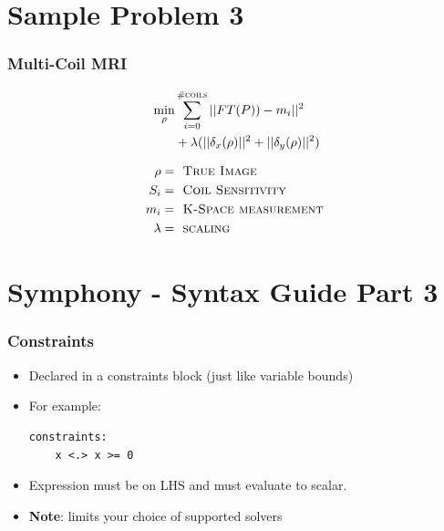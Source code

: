 \documentclass[presentation]{beamer}
\begin{document}
\section{Sample Problem 3}
\begin{frame}
  \frametitle{Multi-Coil MRI}

  \begin{align*}
    \min \limits_{\rho} &\sum \limits_{i=0}^{\textsc{\#coils}} || FT(P))-m_i||^2 \\
                             &+ \lambda (||\delta_x (\rho) ||^2 + || \delta_y(\rho) ||^2) \\
  \end{align*}
  
  \begin{align*}
    \rho &= \textsc{ True Image} \\
    S_i &= \textsc{ Coil Sensitivity} \\
    m_i &= \textsc{ K-Space measurement } \\
    \lambda &= \textsc{ scaling }
  \end{align*}

\end{frame}
\section{Symphony - Syntax Guide Part 3}

\begin{frame}[fragile]
  \frametitle{Constraints}

  \begin{itemize}
  \item Declared in a {\color{red} constraints} block (just like variable bounds)
  \item For example:
  \begin{lstlisting}[style=Haskell]
  constraints:
    x <.> x >= 0  
  \end{lstlisting}
  \item Expression must be on LHS and must evaluate to scalar.
  \item {\bf Note}: limits your choice of supported solvers 
  \end{itemize}
\end{frame}
\end{document}
